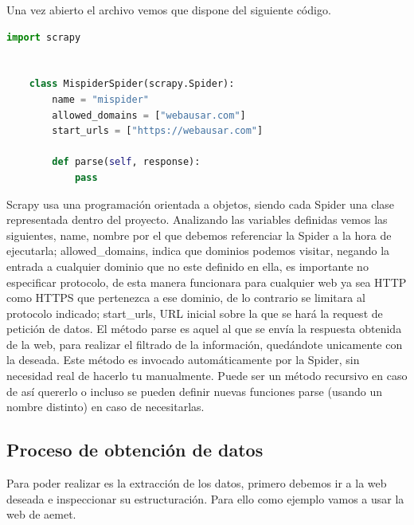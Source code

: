 Una vez abierto el archivo vemos que dispone del siguiente código.

\begin{lstlisting}[language=Python, caption={Spider recién generada}]
	import scrapy
	
	
	class MispiderSpider(scrapy.Spider):
		name = "mispider"
		allowed_domains = ["webausar.com"]
		start_urls = ["https://webausar.com"]
	
		def parse(self, response):
			pass
\end{lstlisting}

Scrapy usa una programación orientada a objetos, siendo cada Spider una clase representada dentro del proyecto.\newline
\newline
Analizando las variables definidas vemos las siguientes, name, nombre por el que debemos referenciar la Spider a la hora de ejecutarla; allowed\_domains, indica que dominios podemos visitar, negando la entrada a cualquier dominio que no este definido en ella, es importante no especificar protocolo, de esta manera funcionara para cualquier web ya sea HTTP como HTTPS que pertenezca a ese dominio, de lo contrario se limitara al protocolo indicado; start\_urls, URL inicial sobre la que se hará la request de petición de datos.\newline
\newline
El método parse es aquel al que se envía la respuesta obtenida de la web, para realizar el filtrado de la información, quedándote unicamente con la deseada. Este método es invocado automáticamente por la Spider, sin necesidad real de hacerlo tu manualmente. Puede ser un método recursivo en caso de así quererlo o incluso se pueden definir nuevas funciones parse (usando un nombre distinto) en caso de necesitarlas.

\subsection{Proceso de obtención de datos}
Para poder realizar es la extracción de los datos, primero debemos ir a la web deseada e inspeccionar su estructuración. Para ello como ejemplo vamos a usar la web de aemet.\newline

